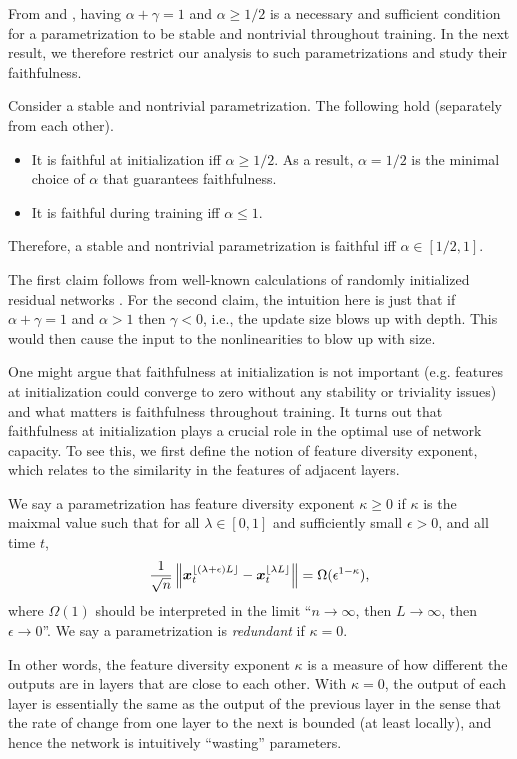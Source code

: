 \documentclass{article}
\theoremstyle{plain}
\theoremstyle{definition}
\begin{document}
From  and , having $\alpha+\gamma=1$ and $\alpha\ge1/2$ is a necessary and sufficient condition for a parametrization to be stable and nontrivial throughout training. In the next result, we therefore restrict our analysis to such parametrizations and study their faithfulness. 
\begin{claim}\label{clm:faithful}
    Consider a stable and nontrivial parametrization. The following hold (separately from each other).
    \begin{itemize}
        \item It is faithful at initialization iff $\alpha \geq 1/2$. As a result, $\alpha=1/2$ is the minimal choice of $\alpha$ that guarantees faithfulness.
        \item It is faithful during training iff $\alpha \le 1$.
    \end{itemize}
Therefore, a stable and nontrivial parametrization is faithful iff $\alpha \in [1/2,1]$.
\end{claim}
The first claim follows from well-known calculations of randomly initialized residual networks \cite{hayou21stable}.
For the second claim, the intuition here is just that if $\alpha+\gamma=1$ and $\alpha>1$
then $\gamma<0$, i.e., the update size blows up with depth. This
would then cause the input to the nonlinearities to blow up with size.

One might argue that faithfulness at initialization is not important (e.g. features at initialization could converge to zero without any stability or triviality issues) and what matters is faithfulness throughout training. It turns out that faithfulness at initialization plays a crucial role in the optimal use of network capacity. To see this, we first define the notion of feature diversity exponent, which relates to the similarity in the features of adjacent layers.
\begin{defn}
We say a parametrization has feature diversity exponent $\kappa\geq 0$ if $\kappa$ is the maixmal value such that for all $\lambda \in [0, 1]$ and sufficiently small $\epsilon > 0$, and all time $t$, 
\[\frac{1}{\sqrt{n}} \left\| \boldsymbol{x}^{\lfloor (\lambda + \epsilon) L \rfloor}_t - \boldsymbol{x}_t^{\lfloor \lambda L \rfloor} \right\| = \Omega(\epsilon^{1-\kappa}),\]
where $\Omega(1)$ should be interpreted in the limit ``$n \to \infty$, then $L \to \infty$, then $\epsilon \to 0$''. We say a parametrization is \emph{redundant} if $\kappa=0$.
\end{defn}
In other words, the feature diversity exponent $\kappa$ is a measure of how different the outputs are in layers that are close to each other. With $\kappa=0$, the output of each layer is essentially the same as the output of the previous layer in the sense that the rate of change from one layer to the next is bounded (at least locally), and hence the network is intuitively ``wasting'' parameters.
\end{document}
